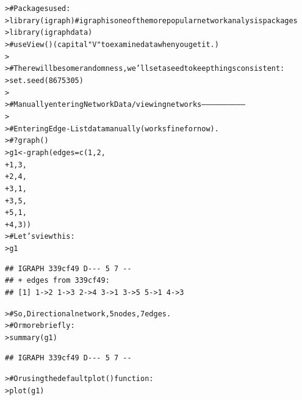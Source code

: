 \documentclass[12pt]{article}\usepackage[]{graphicx}\usepackage[]{color}
\makeatletter
\newcommand{\hlnum}[1]{\textcolor[rgb]{0.82,0.78,0.62}{#1}}%
\newcommand{\hlcom}[1]{\textcolor[rgb]{0.404,0.408,0.42}{#1}}%
\newcommand{\hlstd}[1]{\textcolor[rgb]{0.882,0.878,0.898}{#1}}%
\newcommand{\hlkwb}[1]{\textcolor[rgb]{0.902,0.675,0.196}{#1}}%
\newcommand{\hlkwc}[1]{\textcolor[rgb]{0.812,0.522,0.388}{#1}}%
\newcommand{\hlkwd}[1]{\textcolor[rgb]{0.733,0.388,0.812}{#1}}%
\newenvironment{kframe}{%
 \def\at@end@of@kframe{}%
 \ifinner\ifhmode%
  \def\at@end@of@kframe{\end{minipage}}%
  \begin{minipage}{\columnwidth}%
 \fi\fi%
 \def\FrameCommand##1{\hskip\@totalleftmargin \hskip-\fboxsep
 \colorbox{shadecolor}{##1}\hskip-\fboxsep
     \hskip-\linewidth \hskip-\@totalleftmargin \hskip\columnwidth}%
 \MakeFramed {\advance\hsize-\width
   \@totalleftmargin\z@ \linewidth\hsize
   \@setminipage}}%
 {\par\unskip\endMakeFramed%
 \at@end@of@kframe}
\newenvironment{knitrout}{}{} %
\makeatother
\begin{document}
\begin{flushleft}
\begin{center}
\begin{knitrout}
\color{fgcolor}\begin{kframe}
\begin{alltt}
\hlstd{> }\hlcom{# Packages used:}
\hlstd{> }\hlkwd{library}\hlstd{(igraph)} \hlcom{# igraph is one of the more popular network analysis packages}
\hlstd{> }\hlkwd{library}\hlstd{(igraphdata)}
\hlstd{> }\hlcom{# use  View() (capital "V" to examine data when you get it.)}
\hlstd{> }
\hlstd{> }\hlcom{# There will be some randomness, we'll set a seed to keep things consistent:}
\hlstd{> }\hlkwd{set.seed}\hlstd{(}\hlnum{8675305}\hlstd{)}
\hlstd{> }
\hlstd{> }\hlcom{# Manually entering Network Data/ viewing networks -----------------------------}
\hlstd{> }
\hlstd{> }\hlcom{# Entering Edge-List data manually (works fine for now).}
\hlstd{> }\hlcom{# ?graph()}
\hlstd{> }\hlstd{g1} \hlkwb{<-} \hlkwd{graph}\hlstd{(}\hlkwc{edges}\hlstd{=}\hlkwd{c}\hlstd{(}\hlnum{1}\hlstd{,}\hlnum{2}\hlstd{,}
\hlstd{+ }                    \hlnum{1}\hlstd{,}\hlnum{3}\hlstd{,}
\hlstd{+ }                    \hlnum{2}\hlstd{,}\hlnum{4}\hlstd{,}
\hlstd{+ }                    \hlnum{3}\hlstd{,}\hlnum{1}\hlstd{,}
\hlstd{+ }                    \hlnum{3}\hlstd{,}\hlnum{5}\hlstd{,}
\hlstd{+ }                    \hlnum{5}\hlstd{,}\hlnum{1}\hlstd{,}
\hlstd{+ }                    \hlnum{4}\hlstd{,}\hlnum{3}\hlstd{))}
\hlstd{> }\hlcom{# Let's view this:}
\hlstd{> }\hlstd{g1}
\end{alltt}
\begin{verbatim}
## IGRAPH 339cf49 D--- 5 7 -- 
## + edges from 339cf49:
## [1] 1->2 1->3 2->4 3->1 3->5 5->1 4->3
\end{verbatim}
\begin{alltt}
\hlstd{> }\hlcom{# So, Directional network, 5 nodes, 7 edges.}
\hlstd{> }\hlcom{# Or more briefly:}
\hlstd{> }\hlkwd{summary}\hlstd{(g1)}
\end{alltt}
\begin{verbatim}
## IGRAPH 339cf49 D--- 5 7 --
\end{verbatim}
\begin{alltt}
\hlstd{> }\hlcom{# Or using the default plot() function:}
\hlstd{> }\hlkwd{plot}\hlstd{(g1)}
\end{alltt}
\end{kframe}

\end{knitrout}
\end{center}
\end{flushleft}
\end{document}
